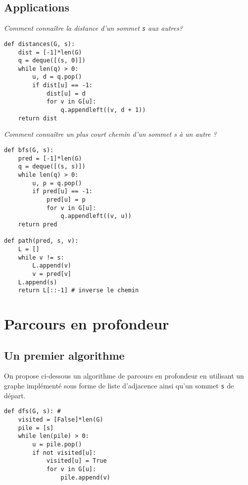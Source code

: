 \subsection{Applications}
\begin{exemple}
\textit{Comment connaître la distance d'un sommet \texttt{s} aux autres?}
\ifprof
\begin{lstlisting}
def distances(G, s):
    dist = [-1]*len(G)
    q = deque([(s, 0)])
    while len(q) > 0:
        u, d = q.pop()
        if dist[u] == -1:
            dist[u] = d
            for v in G[u]:
                q.appendleft((v, d + 1))
    return dist
\end{lstlisting}
\else
\vspace{5cm}
\fi
\end{exemple}

\begin{exemple}
\textit{Comment connaître un plus court chemin d’un sommet s à un autre ? }
\ifprof
\begin{lstlisting}
def bfs(G, s):
    pred = [-1]*len(G)
    q = deque([(s, s)])
    while len(q) > 0:
        u, p = q.pop()
        if pred[u] == -1:
            pred[u] = p
            for v in G[u]:
                q.appendleft((v, u))
    return pred
    
def path(pred, s, v):
    L = []
    while v != s:
        L.append(v)
        v = pred[v]
    L.append(s)
    return L[::-1] # inverse le chemin
\end{lstlisting}
\else
\vspace{10cm}
\fi
\end{exemple}


\section{Parcours en profondeur}
\subsection{Un premier algorithme}

On propose ci-dessous un algorithme de parcours en profondeur en utilisant un graphe implémenté sous forme de liste d'adjacence ainsi qu'un sommet \texttt{s} de départ. 

\begin{lstlisting}
def dfs(G, s): #
    visited = [False]*len(G)
    pile = [s]
    while len(pile) > 0:
        u = pile.pop()
        if not visited[u]:
            visited[u] = True
            for v in G[u]:
                pile.append(v)
\end{lstlisting}


